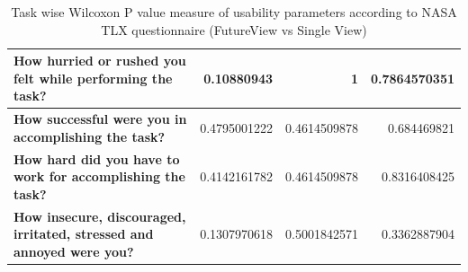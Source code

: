 \documentclass[english]{tktltiki}
\begin{document}
\begin{table}
\begin{center}
\begin{tabular}{|p{6cm}|r|r|r|}
        \textbf{How hurried or rushed you felt while performing the task?} & 0.10880943 & 1 & 0.7864570351 \\
        \hline
        
        \textbf{How successful were you in accomplishing the task?} & 0.4795001222 & 0.4614509878 & 0.684469821 \\
        \hline
        
        \textbf{How hard did you have to work for accomplishing the task?} & 0.4142161782 & 0.4614509878 & 0.8316408425 \\
        \hline
        
        \textbf{How insecure, discouraged, irritated, stressed and annoyed were you?} & 0.1307970618 & 0.5001842571 & 0.3362887904 \\
        \hline
        
    \end{tabular}
	\end{center}
	\caption{Task wise Wilcoxon P value measure of usability parameters according to NASA TLX questionnaire (FutureView vs Single View)}
    \label{table:use_wilcox_task}
\end{table}






\nocite{*}


\end{document}
